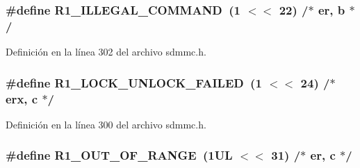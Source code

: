 \subsubsection[{\texorpdfstring{R1\+\_\+\+I\+L\+L\+E\+G\+A\+L\+\_\+\+C\+O\+M\+M\+A\+ND}{R1_ILLEGAL_COMMAND}}]{\setlength{\rightskip}{0pt plus 5cm}\#define R1\+\_\+\+I\+L\+L\+E\+G\+A\+L\+\_\+\+C\+O\+M\+M\+A\+ND~(1 $<$$<$ 22)	/$\ast$ er, b $\ast$/}\hypertarget{group___c_h_i_p___s_d_m_m_c___definitions_ga317730607b37d51a7a470e8f33fa0e4d}{}\label{group___c_h_i_p___s_d_m_m_c___definitions_ga317730607b37d51a7a470e8f33fa0e4d}


Definición en la línea 302 del archivo sdmmc.\+h.

\subsubsection[{\texorpdfstring{R1\+\_\+\+L\+O\+C\+K\+\_\+\+U\+N\+L\+O\+C\+K\+\_\+\+F\+A\+I\+L\+ED}{R1_LOCK_UNLOCK_FAILED}}]{\setlength{\rightskip}{0pt plus 5cm}\#define R1\+\_\+\+L\+O\+C\+K\+\_\+\+U\+N\+L\+O\+C\+K\+\_\+\+F\+A\+I\+L\+ED~(1 $<$$<$ 24)	/$\ast$ erx, c $\ast$/}\hypertarget{group___c_h_i_p___s_d_m_m_c___definitions_ga744d98d4c048190b483002c3e296ba1f}{}\label{group___c_h_i_p___s_d_m_m_c___definitions_ga744d98d4c048190b483002c3e296ba1f}


Definición en la línea 300 del archivo sdmmc.\+h.

\subsubsection[{\texorpdfstring{R1\+\_\+\+O\+U\+T\+\_\+\+O\+F\+\_\+\+R\+A\+N\+GE}{R1_OUT_OF_RANGE}}]{\setlength{\rightskip}{0pt plus 5cm}\#define R1\+\_\+\+O\+U\+T\+\_\+\+O\+F\+\_\+\+R\+A\+N\+GE~(1\+U\+L $<$$<$ 31)	/$\ast$ er, c $\ast$/}\hypertarget{group___c_h_i_p___s_d_m_m_c___definitions_gaa37d05d9beaa72995c616768d98f5089}{}\label{group___c_h_i_p___s_d_m_m_c___definitions_gaa37d05d9beaa72995c616768d98f5089}


